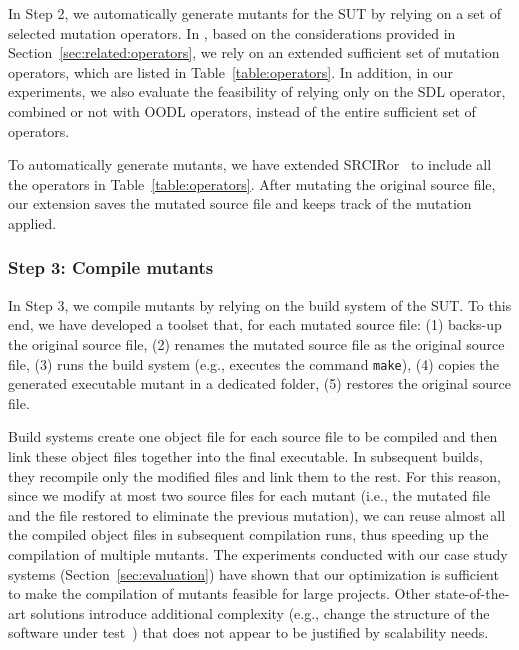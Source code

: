 In Step 2, we automatically generate mutants for the SUT by relying on a set of selected mutation operators.
In \APPR, based on the considerations provided in Section~\ref{sec:related:operators}, we rely on an extended sufficient set of mutation operators, which are listed in Table~\ref{table:operators}.
In addition, in our experiments, we also evaluate the feasibility of relying only on the SDL operator, combined or not with OODL operators, instead of the entire sufficient set of operators.



To automatically generate mutants, we have extended SRCIRor~\cite{hariri2018srciror} to include all the 
operators in Table~\ref{table:operators}.
After mutating the original source file, our extension saves the mutated source file and keeps track of the mutation applied. 

\subsubsection{Step 3: Compile mutants}
\label{sec:appr:compile}

In Step 3, we compile mutants by relying on the build system of the SUT. To this end, we have developed a toolset that, for each mutated source file: (1) backs-up the original source file, (2) renames the mutated source file as the original source file, (3) runs the build system (e.g., executes the command \texttt{make}), (4) copies the generated executable mutant in a dedicated folder, (5) restores the original source file. 

Build systems create one object file for each source file to be compiled and then link these object files together into the final executable. 
 {In subsequent builds, they recompile only the modified files and link them to the rest.}
For this reason, since we modify at most two source files for each mutant (i.e., the mutated file and the file restored to eliminate the previous mutation), we can reuse almost all the compiled object files in subsequent compilation runs, thus speeding up the compilation of multiple mutants. The experiments conducted with our case study systems (Section~\ref{sec:evaluation}) have shown that 
 {our optimization is sufficient to make the compilation of mutants feasible for large projects. Other state-of-the-art solutions introduce additional complexity (e.g., change the structure of the software under test~\cite{untch1993mutation}) that does not appear to be justified by scalability needs.}

